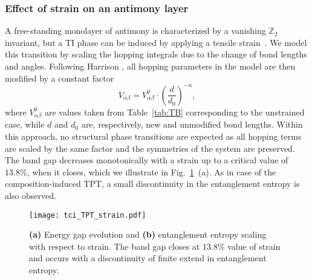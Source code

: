 \subsubsection{Effect of strain on an antimony layer}
A free-standing monolayer of antimony is characterized by a vanishing $\mathbb{Z}_2$ invariant, but a TI phase can be induced by applying a tensile strain~\cite{Sb:nontriv}. We model this transition by scaling the hopping integrals due to the change of bond lengths and angles. Following Harrison \cite{harrison}, all hopping parameters in the model are then modified by a constant factor
\begin{equation}
V_{\alpha \beta } = V_{\alpha \beta}^0 \cdot \left( \frac{d}{d_0} \right)^{-n},
\label{eq:hopping_rescale}
\end{equation}
where $V_{\alpha \beta}^0$ are values taken from Table~\ref{tab:TB} corresponding to the unstrained case, while $d$ and $d_0$ are, respectively, new and unmodified bond lengths. Within this approach, no structural phase transitions are expected as all hopping terms are scaled by the same factor and the symmetries of the system are preserved. The band gap decreases monotonically with a strain up to a critical value of $13.8 \%$, when it closes, which we illustrate in Fig.~\ref{fig:TPT_strain}~(a). As in case of the composition-induced TPT, a small discontinuity in the entanglement entropy is also observed.

\begin{figure}[H]
\centering
\texttt{[image: tci\_TPT\_strain.pdf]}
\caption[Energy gap and entanglement entropy as a function of strain in free-standing antimony monolayer]{\textbf{(a)} Energy gap evolution and \textbf{(b)} entanglement entropy scaling with respect to strain. The band gap closes at $13.8 \%$ value of strain and occurs with a discontinuity of finite extend in entanglement entropy.}
\label{fig:TPT_strain}
\end{figure}


